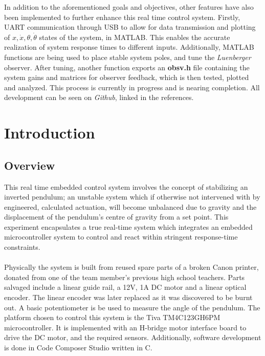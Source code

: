 \documentclass[12pt]{article}
\begin{document}
In addition to the aforementioned goals and objectives, other features have also been implemented to further enhance this real time control system. Firstly, UART communication through USB to allow for data transmission and plotting of $x, \dot{x}, \theta, \dot{\theta}$ states of the system, in MATLAB. This enables the accurate realization of system response times to different inputs. Additionally, MATLAB functions are being used to place stable system poles, and tune the \textit{Luenberger} observer. After tuning, another function exports an \textbf{obsv.h} file containing the system gains and matrices for observer feedback, which is then tested, plotted and analyzed. This process is currently in progress and is nearing completion. All development can be seen on \textit{Github}, linked in the references.

\newpage
\tableofcontents
\listoffigures
\newpage

\section{Introduction}
\subsection{Overview}
This real time embedded control system involves the concept of stabilizing an inverted pendulum; an unstable system which if otherwise not intervened with by engineered, calculated actuation, will become unbalanced due to gravity and the displacement of the pendulum's centre of gravity from a set point. This experiment encapsulates a true real-time system which integrates an embedded microcontroller system to control and react within stringent response-time constraints.
\\\\
Physically the system is built from reused spare parts of a broken Canon printer, donated from one of the team member's previous high school teachers. Parts salvaged include a linear guide rail, a 12V, 1A DC motor and a linear optical encoder. The linear encoder was later replaced as it was discovered to be burnt out. A basic potentiometer is be used to measure the angle of the pendulum. The platform chosen to control this system is the Tiva TM4C123GH6PM microcontroller. It is implemented with an H-bridge motor interface board to drive the DC motor, and the required sensors. Additionally, software development is done in Code Composer Studio written in C.
\end{document}
